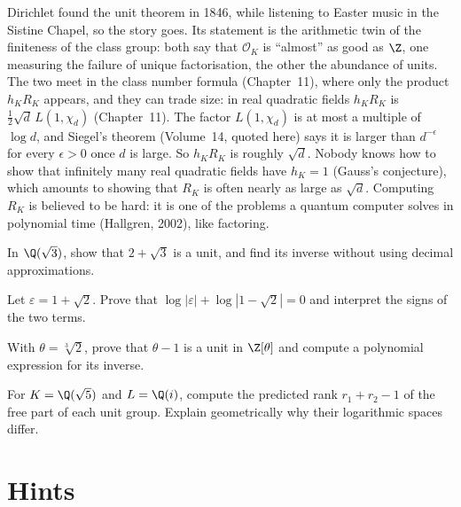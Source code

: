 \begin{beauty}
Dirichlet found the unit theorem in 1846, while listening to Easter music in the Sistine Chapel, so the story goes. Its
statement is the arithmetic twin of the finiteness of the class group: both say that $\mathcal O_K$ is ``almost'' as good as
$\Z$, one measuring the failure of unique factorisation, the other the abundance of units. The two meet in the class
number formula (Chapter~11), where only the product $h_KR_K$ appears, and they can trade size: in real quadratic fields
$h_KR_K$ is $\frac12\sqrt d\,L(1,\chi_d)$ (Chapter~11). The factor $L(1,\chi_d)$ is at most a multiple of $\log d$, and Siegel's theorem (Volume~14, quoted here) says it is larger than $d^{-\epsilon}$ for every $\epsilon>0$ once $d$ is large. So $h_KR_K$ is roughly $\sqrt d$. Nobody knows how to show that infinitely many real quadratic fields have $h_K=1$ (Gauss's conjecture), which
amounts to showing that $R_K$ is often nearly as large as $\sqrt d$. Computing $R_K$ is believed to be hard: it is one of the
problems a quantum computer solves in polynomial time (Hallgren, 2002), like factoring.
\end{beauty}

\begin{exercise}[$\star$]\label{ex:v13-extra-06-1}
In $\Q(\sqrt3)$, show that $2+\sqrt3$ is a unit, and find its inverse without using decimal approximations.
\end{exercise}

\begin{exercise}[$\star$]\label{ex:v13-extra-06-2}
Let $\varepsilon=1+\sqrt2$. Prove that $\log|\varepsilon|+\log|1-\sqrt2|=0$ and interpret the signs of the two terms.
\end{exercise}

\begin{exercise}[$\star\star$]\label{ex:v13-extra-06-3}
With $\theta=\sqrt[3]2$, prove that $\theta-1$ is a unit in $\Z[\theta]$ and compute a polynomial expression for its inverse.
\end{exercise}

\begin{exercise}[$\star\star$]\label{ex:v13-extra-06-4}
For $K=\Q(\sqrt5)$ and $L=\Q(i)$, compute the predicted rank $r_1+r_2-1$ of the free part of each unit group. Explain geometrically why their logarithmic spaces differ.
\end{exercise}

\section{Hints}

